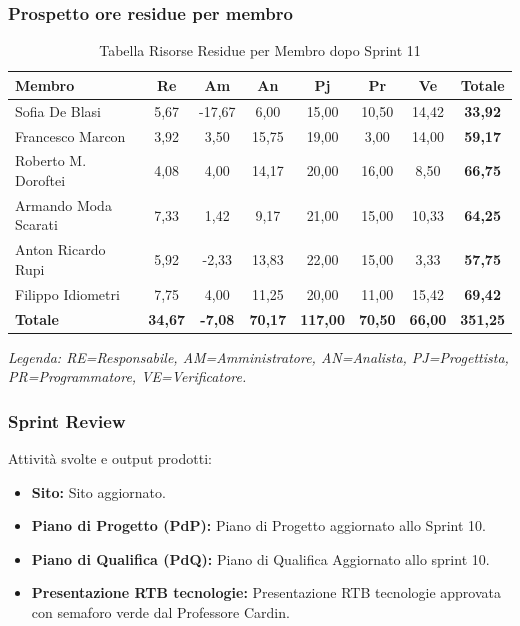 \subsubsection{Prospetto ore residue per membro}
\begin{table}[H]
    \centering
    \renewcommand{\arraystretch}{1.3}
    \begin{tabularx}{\textwidth}{|X|c|c|c|c|c|c|c|}
        \hline
        \textbf{Membro} & \textbf{Re} & \textbf{Am} & \textbf{An} &
        \textbf{Pj} & \textbf{Pr} & \textbf{Ve} & \textbf{Totale} \\
        \hline
        Sofia De Blasi       &  5,67 & -17,67 &  6,00 & 15,00 & 10,50 & 14,42 & \textbf{33,92} \\
        Francesco Marcon     &  3,92 &  3,50 & 15,75 & 19,00 &  3,00 & 14,00 & \textbf{59,17} \\
        Roberto M. Doroftei  &  4,08 &  4,00 & 14,17 & 20,00 & 16,00 &  8,50 & \textbf{66,75} \\
        Armando Moda Scarati &  7,33 &  1,42 &  9,17 & 21,00 & 15,00 & 10,33 & \textbf{64,25} \\
        Anton Ricardo Rupi   &  5,92 &  -2,33 & 13,83 & 22,00 & 15,00 &  3,33 & \textbf{57,75} \\
        Filippo Idiometri    &  7,75 &  4,00 & 11,25 & 20,00 & 11,00 & 15,42 & \textbf{69,42} \\
        \hline
        \textbf{Totale} &
        \textbf{34,67} & \textbf{-7,08} & \textbf{70,17} &
        \textbf{117,00} & \textbf{70,50} & \textbf{66,00} &
        \textbf{351,25} \\
        \hline
    \end{tabularx}
    \begin{minipage}{\textwidth}
        \smallskip
        \footnotesize\textit{Legenda: RE=Responsabile, AM=Amministratore,
        AN=Analista, PJ=Progettista, PR=Programmatore, VE=Verificatore.}
    \end{minipage}
    \caption{Tabella Risorse Residue per Membro dopo Sprint 11}
\end{table}

\subsubsection{Sprint Review}
Attività svolte e output prodotti:
\begin{itemize}
    \item \textbf{Sito:} Sito aggiornato.
    \item \textbf{Piano di Progetto (PdP):} Piano di Progetto aggiornato allo Sprint 10.
    \item \textbf{Piano di Qualifica (PdQ):} Piano di Qualifica Aggiornato allo sprint 10.
    \item \textbf{Presentazione RTB tecnologie:} Presentazione RTB tecnologie approvata con semaforo verde dal Professore Cardin.
\end{itemize}

